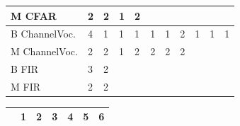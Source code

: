 \begin{table}[t]
\begin{minipage}{0.5\textwidth}
\begin{tabular} { | l | l | l | l | l | l | l | l | l | l |l| }
    M CFAR & 2 & 2  & 1  & 2 & \cellcolor[gray]{0.3}& \cellcolor[gray]{0.3}& \cellcolor[gray]{0.3}& \cellcolor[gray]{0.3}& \cellcolor[gray]{0.3}& \cellcolor[gray]{0.3} \\ \hline\hline
    B ChannelVoc.& 4 & 1 & 1 & 1 & 1 & 1 & 2 & 1 & 1 & 1 \\ \hline 
    M ChannelVoc.& 2 & 2 & 1 & 2 & 2& 2 & 2& \cellcolor[gray]{0.3}& \cellcolor[gray]{0.3}& \cellcolor[gray]{0.3} \\ \hline\hline
    B FIR & 3 & 2 &\cellcolor[gray]{0.3}&\cellcolor[gray]{0.3}&\cellcolor[gray]{0.3}&\cellcolor[gray]{0.3}&\cellcolor[gray]{0.3}&\cellcolor[gray]{0.3}&\cellcolor[gray]{0.3}&\cellcolor[gray]{0.3}\\ \hline
    M FIR & 2 & 2&\cellcolor[gray]{0.3}&\cellcolor[gray]{0.3}&\cellcolor[gray]{0.3}&\cellcolor[gray]{0.3}&\cellcolor[gray]{0.3}&\cellcolor[gray]{0.3}&\cellcolor[gray]{0.3}&\cellcolor[gray]{0.3}\\ \hline\hline
    \end{tabular}
  \end{minipage}	\hfill
  \hspace{1em}
\begin{minipage}{0.5\textwidth}

	 \begin{tabular} { | l | l | l | l | l | l | l |}
    \hline
      & \textbf{1} & \textbf{2} & \textbf{3} & \textbf{4} & \textbf{5} & \textbf{6}  \\ \hline


\end{tabular}
\end{minipage}
\end{table}
